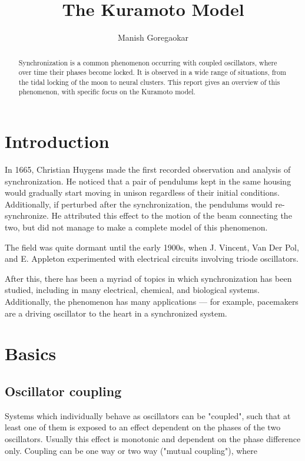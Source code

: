 \documentclass[12pt]{article}
\begin{document}
\title{The Kuramoto Model}
\author{Manish Goregaokar}

\maketitle

\begin{abstract}
Synchronization is a common phenomenon occurring with coupled oscillators, where over time their phases become locked. It is observed in a wide range of situations, from the tidal locking of the moon to neural clusters. This report gives an overview of this phenomenon, with specific focus on the Kuramoto model.
\end{abstract}
\tableofcontents
\section{Introduction}

In 1665, Christian Huygens made the first recorded observation and analysis of synchronization\cite{bennett2002huygens}. He noticed that a pair of pendulums kept in the same housing would gradually start moving in unison regardless of their initial conditions. Additionally, if perturbed after the synchronization, the pendulums would re-synchronize. He attributed this effect to the motion of the beam connecting the two, but did not manage to make a complete model of this phenomenon.

The field was quite dormant until the early 1900s, when J. Vincent\cite{vincent1919some}, Van Der Pol\cite{van1920theory}, and E. Appleton\cite{appleton1922automatic} experimented with electrical circuits involving triode oscillators.

After this, there has been a myriad of topics in which synchronization has been studied, including in many electrical, chemical, and biological systems. Additionally, the phenomenon has many applications --- for example, pacemakers are a driving oscillator to the heart in a synchronized system.

\section{Basics}
\subsection{Oscillator coupling}
Systems which individually behave as oscillators can be "coupled", such that at least one of them is exposed to an effect dependent on the phases of the two oscillators. Usually this effect is monotonic and dependent on the phase difference only. Coupling can be one way or two way ("mutual coupling"), where


\end{document}
